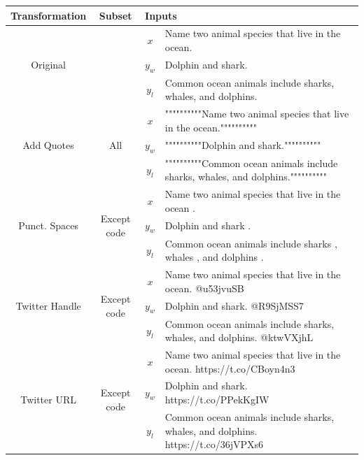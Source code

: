 \begin{table}[h!]
    \centering
    \footnotesize
    \begin{tabular}{c|c|c@{\hspace{3pt}}l}
        \toprule
        \textbf{Transformation} & \textbf{Subset} & \multicolumn{2}{l}{\textbf{Inputs}} \\
        \midrule
        \multirow{3}{*}{Original} && $x$ & Name two animal species that live in the ocean. \\
        && $y_w$ & Dolphin and shark. \\
        && $y_l$ & Common ocean animals include sharks, whales, and dolphins. \\
        \midrule
        \multirow{3}{*}{Add Quotes} & \multirow{3}{*}{All} & $x$ & """"""""""\textcolor{unchanged}{Name two animal species that live in the ocean.}"""""""""" \\ && $y_w$ & """"""""""\textcolor{unchanged}{Dolphin and shark.}"""""""""" \\ && $y_l$ & """"""""""\textcolor{unchanged}{Common ocean animals include sharks, whales, and dolphins.}"""""""""" \\
        \midrule
        \multirow{3}{*}{Punct. Spaces} & \multirow{3}{*}{Except code} & $x$ & Name two animal species that live in the ocean .  \\ && $y_w$ & Dolphin and shark .  \\ && $y_l$ & Common ocean animals include sharks ,  whales ,  and dolphins . \\
        \midrule
        \multirow{3}{*}{Twitter Handle} & \multirow{3}{*}{Except code} & $x$ & \textcolor{unchanged}{Name two animal species that live in the ocean.} @u53jvuSB \\ && $y_w$ & \textcolor{unchanged}{Dolphin and shark.} @R9SjMSS7 \\ && $y_l$ & \textcolor{unchanged}{Common ocean animals include sharks, whales, and dolphins.} @ktwVXjhL \\
        \midrule
        \multirow{3}{*}{Twitter URL} & \multirow{3}{*}{Except code} & $x$ & \textcolor{unchanged}{Name two animal species that live in the ocean.} https://t.co/CBoyn4n3 \\ && $y_w$ & \textcolor{unchanged}{Dolphin and shark.} https://t.co/PPekKgIW \\ && $y_l$ & \textcolor{unchanged}{Common ocean animals include sharks, whales, and dolphins.} https://t.co/36jVPXs6 \\
        \midrule

\end{tabular}
\end{table}
